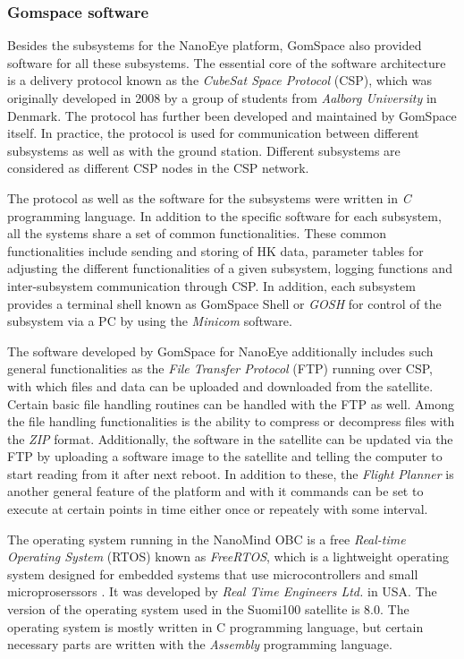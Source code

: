 \documentclass[english,12pt,a4paper,pdftex,elec,utf8]{aaltothesis}
\begin{document}
\subsubsection{Gomspace software}
Besides the subsystems for the NanoEye platform, GomSpace also provided software for all these subsystems. The essential core of the software architecture is a delivery protocol known as the \textit{CubeSat Space Protocol} (CSP), which was originally developed in 2008 by a group of students from \textit{Aalborg University} in Denmark. The protocol has further been developed and maintained by GomSpace itself. In practice, the protocol is used for communication between different subsystems as well as with the ground station. Different subsystems are considered as different CSP nodes in the CSP network. \cite{gomspacesdk}\par 
The protocol as well as the software for the subsystems were written in \textit{C} programming language. In addition to the specific software for each subsystem, all the systems share a set of common functionalities. These common functionalities include sending and storing of HK data, parameter tables for adjusting the different functionalities of a given subsystem, logging functions and inter-subsystem communication through CSP. In addition, each subsystem provides a terminal shell known as GomSpace Shell or \textit{GOSH} for control of the subsystem via a PC by using the \textit{Minicom} software. \cite{gomspacesdk} \par 
The software developed by GomSpace for NanoEye additionally includes such general functionalities as the \textit{File Transfer Protocol} (FTP) running over CSP, with which files and data can be uploaded and downloaded from the satellite. Certain basic file handling routines can be handled with the FTP as well. Among the file handling functionalities is the ability to compress or decompress files with the \textit{ZIP} format. Additionally, the software in the satellite can be updated via the FTP by uploading a software image to the satellite and telling the computer to start reading from it after next reboot. In addition to these, the \textit{Flight Planner} is another general feature of the platform and with it commands can be set to execute at certain points in time either once or repeately with some interval. \cite{gomspacesdk}\par
The operating system running in the NanoMind OBC is a free \textit{Real-time Operating System} (RTOS) known as \textit{FreeRTOS}, which is a lightweight operating system designed for embedded systems that use microcontrollers and small microproserssors \cite{freertosref}. It was developed by \textit{Real Time Engineers Ltd.} in USA. The version of the operating system used in the Suomi100 satellite is 8.0. The operating system is mostly written in C programming language, but certain necessary parts are written with the \textit{Assembly} programming language.\par 
\end{document}

